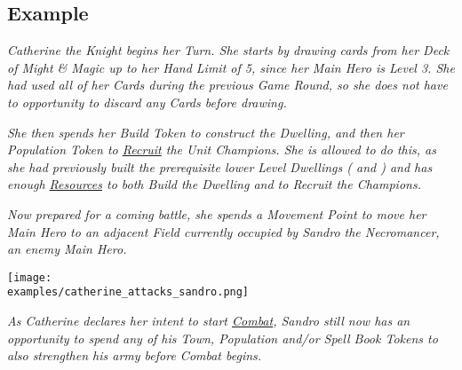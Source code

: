 \begin{multicols}{2}
\subsection*{Example}

\textit{Catherine the Knight begins her Turn. She starts by drawing cards from her Deck of Might \& Magic up to her Hand Limit  of 5, since her Main Hero is Level 3.
She had used all of her Cards during the previous Game Round, so she does not have to opportunity to discard any Cards before drawing.}\par
\textit{She then spends her Build Token to construct the  Dwelling, and then her Population Token to \hyperlink{Units}{Recruit} the  Unit Champions.
She is allowed to do this, as she had previously built the prerequisite lower Level Dwellings ( and ) and has enough \hyperlink{Resources}{Resources} to both Build the Dwelling and to Recruit the Champions.}\par
\textit{Now prepared for a coming battle, she spends a Movement Point to move her Main Hero to an adjacent Field currently occupied by Sandro the Necromancer, an enemy Main Hero.}\par

\texttt{[image: \\examples/catherine\_attacks\_sandro.png]}

\textit{As Catherine declares her intent to start \hyperlink{Combat}{Combat}, Sandro still now has an opportunity to spend any of his Town, Population and/or Spell Book Tokens to also strengthen his army before Combat begins.}

\end{multicols}
